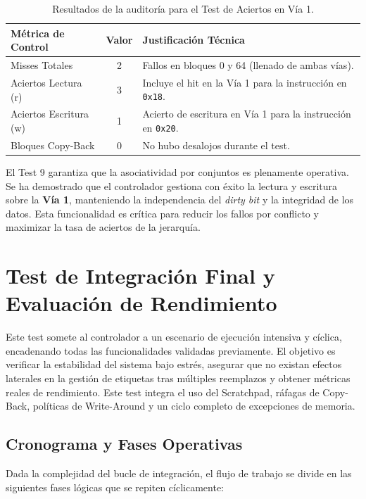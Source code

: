 \documentclass[12pt,a4paper]{article}
\begin{document}
\begin{table}[H]
\centering
\small
\renewcommand{\arraystretch}{1.2}
\begin{tabular}{|l|c|l|}
\hline
\rowcolor[HTML]{EFEFEF} 
\textbf{Métrica de Control} & \textbf{Valor} & \textbf{Justificación Técnica} \\ \hline
Misses Totales & 2 & Fallos en bloques 0 y 64 (llenado de ambas vías). \\ \hline
Aciertos Lectura (r) & 3 & Incluye el hit en la Vía 1 para la instrucción en \texttt{0x18}. \\ \hline
Aciertos Escritura (w) & 1 & Acierto de escritura en Vía 1 para la instrucción en \texttt{0x20}. \\ \hline
Bloques Copy-Back & 0 & No hubo desalojos durante el test. \\ \hline
\end{tabular}
\caption{Resultados de la auditoría para el Test de Aciertos en Vía 1.}
\label{tab:audit_test9}
\end{table}

El Test 9 garantiza que la asociatividad por conjuntos es plenamente operativa. Se ha demostrado que el controlador gestiona con éxito la lectura y escritura sobre la \textbf{Vía 1}, manteniendo la independencia del \textit{dirty bit} y la integridad de los datos. Esta funcionalidad es crítica para reducir los fallos por conflicto y maximizar la tasa de aciertos de la jerarquía.

\newpage

\section{Test de Integración Final y Evaluación de Rendimiento}

Este test somete al controlador a un escenario de ejecución intensiva y cíclica, encadenando todas las funcionalidades validadas previamente. El objetivo es verificar la estabilidad del sistema bajo estrés, asegurar que no existan efectos laterales en la gestión de etiquetas tras múltiples reemplazos y obtener métricas reales de rendimiento. Este test integra el uso del Scratchpad, ráfagas de Copy-Back, políticas de Write-Around y un ciclo completo de excepciones de memoria.

\subsection{Cronograma y Fases Operativas}

Dada la complejidad del bucle de integración, el flujo de trabajo se divide en las siguientes fases lógicas que se repiten cíclicamente:
\end{document}
